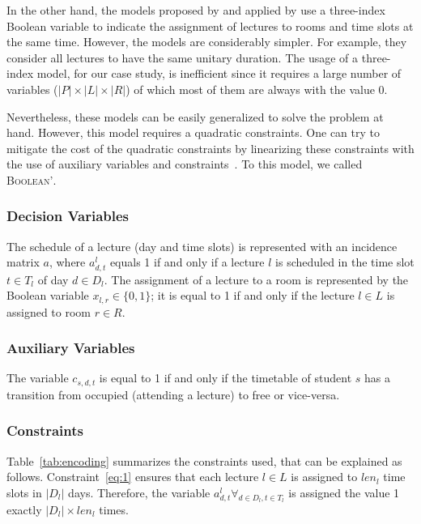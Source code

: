 \documentclass[twocolumn,natbib]{svjour3}          %
\newcounter{constraint}
\begin{document}
In the other hand, the models proposed by \cite{Burke} and applied by \cite{LINDAHL2019} use a three-index Boolean variable to indicate the assignment of lectures to rooms and time slots at the same time. However, the models are considerably simpler. For example, they consider all lectures to have the same unitary duration. The usage of a three-index model, for our case study, is inefficient since it requires a large number of variables ($|P| \times |L| \times |R|$) of which most of them are always with the value 0. 

Nevertheless, these models can be easily generalized to solve the problem at hand. However, this model requires a quadratic constraints. One can try to mitigate the cost of the quadratic constraints by linearizing these constraints with the use of auxiliary variables and constraints~\cite{sherali1998reformulation}. To this model, we called \textsc{Boolean'}.

\subsubsection{Decision Variables}

The schedule of a lecture (day and time slots) is represented with an incidence matrix $a$, where $a^l_{d,t}$ equals 1 if and only if a lecture $l$ is scheduled in the time slot $t \in T_l$ of day $d \in D_l$. The assignment of a lecture to a room is represented by the Boolean variable $x_{l,r} \in \{0, 1\}$; it is equal to 1 if and only if the lecture $l \in L$ is assigned to room $r \in R$.

\subsubsection{Auxiliary Variables}

The variable $c_{s,d,t}$ is equal to 1 if and only if the timetable of student $s$  has a transition from occupied (attending a lecture) to free or vice-versa.


\subsubsection{Constraints}
Table~\ref{tab:encoding} summarizes the constraints used, that can be explained as follows. Constraint~\ref{eq:1} ensures that each lecture $l \in L$ is assigned to $len_l$ time slots in $|D_l|$ days. Therefore, the variable  $a^l_{d,t} \forall_{d \in D_l, t\in T_l}$ is assigned the value 1 exactly $|D_l|\times len_l$ times.
\end{document}
